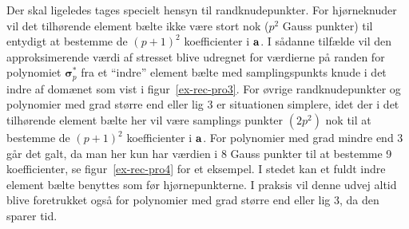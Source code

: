 Der skal ligeledes tages specielt hensyn til randknudepunkter. For
hjørneknuder vil det tilhørende element bælte ikke være stort nok
($p^2$ Gauss punkter) til entydigt at bestemme de $(p+1)^2$
koefficient\-er i ${\bf a}$. I sådanne tilfælde vil den
approksimerende værdi af stresset blive udregnet for værdierne på
randen for polynomiet $\pmb{\sigma}^{\ast}_p$ fra et ``indre''
element bælte med samplingspunkts knude i det indre af domænet som
vist i figur~\ref{ex-rec-pro3}. For øvrige
randknudepunkter og polynomier med grad større end eller lig 3 er
situationen simplere, idet der i det tilhørende element bælte her vil
være samplings punkter $(2p^2)$ nok til at bestemme de $(p+1)^2$
koefficienter i ${\bf a}$. For polynomier med grad mindre end 3 går
det galt, da man her kun har værdien i 8 Gauss punkter til at bestemme
9 koefficienter, se figur~\ref{ex-rec-pro4} for et eksempel. I stedet
kan et fuldt indre element bælte benyttes som før hjørnepunkterne. I
praksis vil denne udvej altid blive foretrukket også for polynomier
med grad større end eller lig 3, da den sparer tid.

